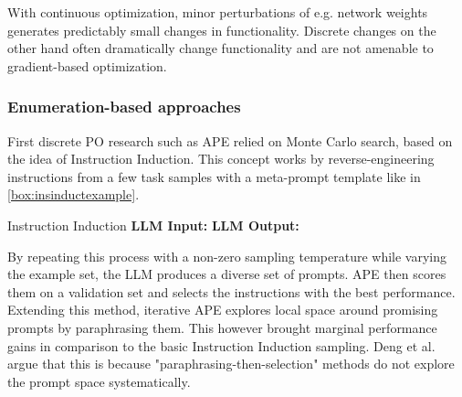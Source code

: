With continuous optimization, minor perturbations of e.g. network weights generates predictably small changes in functionality.
Discrete changes on the other hand often dramatically change functionality\cite{lehman2022evolutionlargemodels} 
and are not amenable to gradient-based optimization\cite{deng2022rlpromptoptimizingdiscretetext}. 


\subsubsection{Enumeration-based approaches}
First discrete PO research such as APE\cite{zhou2023largelanguagemodelshumanlevel} 
relied on Monte Carlo search, based on the idea of Instruction Induction\cite{honovich2022instructioninductionexamplesnatural}.
This concept works by reverse-engineering instructions from a few task samples with a meta-prompt template like in \ref{box:insinductexample}. 


\begin{promptbox}
    [label={box:insinductexample}]{Instruction Induction}
    \textbf{LLM Input:} 
    \textbf{LLM Output:}
    
\end{promptbox}

By repeating this process with a non-zero sampling temperature while varying the example set,
the LLM produces a diverse set of prompts. APE then scores them on a validation set and selects the instructions with the best performance.
Extending this method, iterative APE explores local space around promising prompts by paraphrasing them.
This however brought marginal performance gains in comparison to the basic Instruction Induction sampling\cite{zhou2023largelanguagemodelshumanlevel}.
Deng et al.\cite{deng2022rlpromptoptimizingdiscretetext} argue that this is because "paraphrasing-then-selection" methods do not explore the prompt space systematically.

